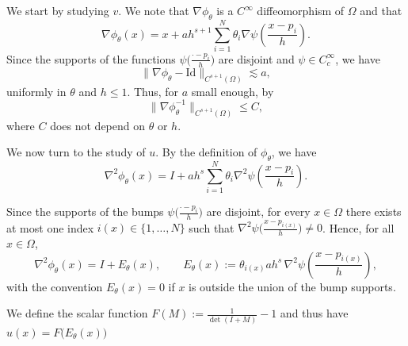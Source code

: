 \documentclass{article}
\newcommand{\1}{\mathds{1}}
\theoremstyle{plain}
\theoremstyle{definition}
\theoremstyle{remark}
\begin{document}
We start by studying $v$. We note that $\nabla \phi_\theta$ is a $C^{\infty}$ diffeomorphism of $\Omega$ and that
\begin{equation}
    \nabla \phi_\theta(x)
=
x + a h^{s+1} \sum_{i=1}^N \theta_i \nabla \psi \left(\frac{x-p_i}{h}\right).
\end{equation}
Since the supports of the functions $\psi\bigl(\frac{\cdot-p_i}{h}\bigr)$ are disjoint and $\psi\in C^\infty_c$,
we have
\begin{equation}
    \|\nabla \phi_\theta - \mathrm{Id}\|_{C^{s+1}(\Omega)} \lesssim a,
\end{equation}
uniformly in $\theta$ and $h\leq 1$. Thus, for $a$ small enough, by 
\begin{equation}
    \|\nabla \phi_\theta^{-1}\|_{C^{s+1}(\Omega)} \le C,
\end{equation}
where $C$ does not depend on $\theta$ or $h$.

We now turn to the study of $u$. By the definition of $\phi_\theta$, we have
\begin{equation}
    \nabla^2 \phi_\theta(x)
=
I + a h^{s} \sum_{i=1}^N \theta_i \nabla^2 \psi \left(\frac{x-p_i}{h}\right).
\end{equation}

Since the supports of the bumps $\psi\bigl(\frac{\cdot-p_i}{h}\bigr)$ are disjoint, for every $x\in\Omega$ there exists at most one index
$i(x)\in\{1,\dots,N\}$ such that $\nabla^2\psi\bigl(\frac{x-p_{i(x)}}{h}\bigr)\neq 0$. Hence, for all $x\in\Omega$,
\begin{equation}
\label{eq:E_theta_def}
\nabla^2 \phi_\theta(x)= I + E_\theta(x),
\qquad
E_\theta(x):= \theta_{i(x)} a h^{s}\,\nabla^2\psi\!\left(\frac{x-p_{i(x)}}{h}\right),
\end{equation}
with the convention $E_\theta(x)=0$ if $x$ is outside the union of the bump supports.

We define the scalar function $F(M):=\frac{1}{\det(I+M)}-1$
and thus have $u(x) = F\bigl(E_\theta(x)\bigr)$  
\end{document}
